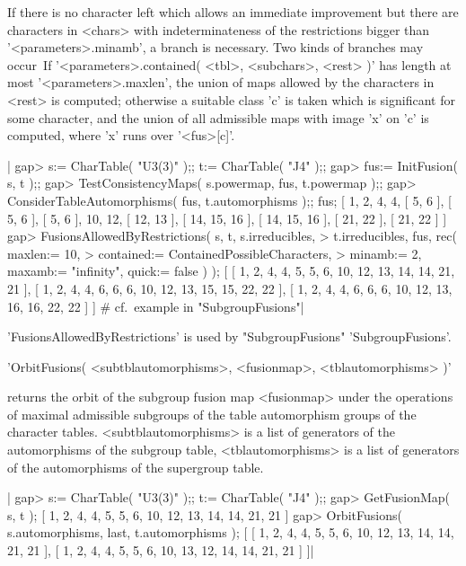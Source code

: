If there is no character left which allows an immediate improvement but there
are characters in <chars> with indeterminateness of the restrictions bigger
than '<parameters>.minamb', a branch is necessary. Two kinds of branches may
occur\:\ If '<parameters>.contained( <tbl>, <subchars>, <rest> )' has
length at most '<parameters>.maxlen', the union of maps allowed by the
characters in <rest> is computed; otherwise a suitable class 'c' is taken
which is significant for some character, and the union of all admissible maps
with image 'x' on 'c' is computed, where 'x' runs over '<fus>[c]'.

|    gap> s:= CharTable( "U3(3)" );; t:= CharTable( "J4" );;
    gap> fus:= InitFusion( s, t );;
    gap> TestConsistencyMaps( s.powermap, fus, t.powermap );;
    gap> ConsiderTableAutomorphisms( fus, t.automorphisms );; fus;
    [ 1, 2, 4, 4, [ 5, 6 ], [ 5, 6 ], [ 5, 6 ], 10, 12, [ 12, 13 ], 
      [ 14, 15, 16 ], [ 14, 15, 16 ], [ 21, 22 ], [ 21, 22 ] ]
    gap> FusionsAllowedByRestrictions( s, t, s.irreducibles,
    >             t.irreducibles, fus, rec( maxlen:= 10,
    >             contained:= ContainedPossibleCharacters,
    >             minamb:= 2, maxamb:= "infinity", quick:= false ) );
    [ [ 1, 2, 4, 4, 5, 5, 6, 10, 12, 13, 14, 14, 21, 21 ], 
      [ 1, 2, 4, 4, 6, 6, 6, 10, 12, 13, 15, 15, 22, 22 ], 
      [ 1, 2, 4, 4, 6, 6, 6, 10, 12, 13, 16, 16, 22, 22 ] ]
    # cf.\ example in "SubgroupFusions"|

'FusionsAllowedByRestrictions' is used by "SubgroupFusions"
'SubgroupFusions'.


'OrbitFusions( <subtblautomorphisms>, <fusionmap>, <tblautomorphisms> )'

returns the orbit of the subgroup fusion map <fusionmap> under the operations
of maximal admissible subgroups of the table automorphism groups of the
character tables. <subtblautomorphisms> is a list of generators of the
automorphisms of the subgroup table, <tblautomorphisms> is a list of
generators of the automorphisms of the supergroup table.

|    gap> s:= CharTable( "U3(3)" );; t:= CharTable( "J4" );;
    gap> GetFusionMap( s, t );
    [ 1, 2, 4, 4, 5, 5, 6, 10, 12, 13, 14, 14, 21, 21 ]
    gap> OrbitFusions( s.automorphisms, last, t.automorphisms );
    [ [ 1, 2, 4, 4, 5, 5, 6, 10, 12, 13, 14, 14, 21, 21 ], 
      [ 1, 2, 4, 4, 5, 5, 6, 10, 13, 12, 14, 14, 21, 21 ] ]|

